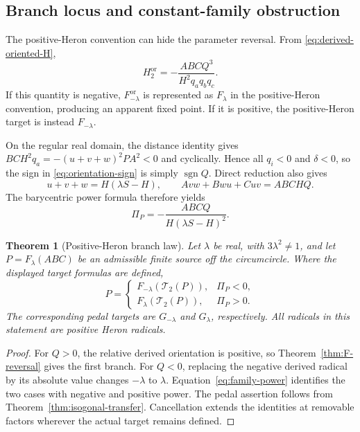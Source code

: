 \documentclass[11pt]{article}
\newtheorem{theorem}{Theorem}
\newcommand{\Circ}{\mathcal T_2}
\begin{document}
\subsection{Branch locus and constant-family obstruction}

The positive-Heron convention can hide the parameter reversal.  From
\eqref{eq:derived-oriented-H},
\begin{equation}\label{eq:orientation-sign}
 H_2^{\mathrm{or}}
 =-\frac{ABCQ^3}{H^2q_aq_bq_c}.
\end{equation}
If this quantity is negative, $F_{-\lambda}^{\mathrm{or}}$ is represented
as $F_\lambda$ in the positive-Heron convention, producing an apparent
fixed point.  If it is positive, the positive-Heron target is instead
$F_{-\lambda}$.

On the regular real domain, the distance identity gives
$BCH^2q_a=-(u+v+w)^2PA^2<0$ and cyclically.  Hence all $q_i<0$ and
$\delta<0$, so the sign in \eqref{eq:orientation-sign} is simply
$\operatorname{sgn}Q$.  Direct reduction also gives
\[
 u+v+w=H(\lambda S-H),\qquad
 Avw+Bwu+Cuv=ABCHQ.
\]
The barycentric power formula therefore yields
\begin{equation}\label{eq:family-power}
 \Pi_P=-\frac{ABCQ}{H(\lambda S-H)^2}.
\end{equation}

\begin{theorem}[Positive-Heron branch law]\label{thm:positive-branch}
Let $\lambda$ be real, with $3\lambda^2\ne1$, and let
$P=F_\lambda(ABC)$ be an admissible finite source off the circumcircle.
Where the displayed target formulas are defined,
\[
 P=\begin{cases}
 F_{-\lambda}(\Circ(P)),&\Pi_P<0,\\
 F_{\lambda}(\Circ(P)),&\Pi_P>0.
 \end{cases}
\]
The corresponding pedal targets are $G_{-\lambda}$ and $G_\lambda$,
respectively.  All radicals in this statement are positive Heron radicals.
\end{theorem}
\begin{proof}
For $Q>0$, the relative derived orientation is positive, so
Theorem~\ref{thm:F-reversal} gives the first branch.  For $Q<0$, replacing
the negative derived radical by its absolute value changes $-\lambda$ to
$\lambda$.  Equation~\eqref{eq:family-power} identifies the two cases with
negative and positive power.  The pedal assertion follows from
Theorem~\ref{thm:isogonal-transfer}.  Cancellation extends the identities
at removable factors wherever the actual target remains defined.
\end{proof}
\end{document}
